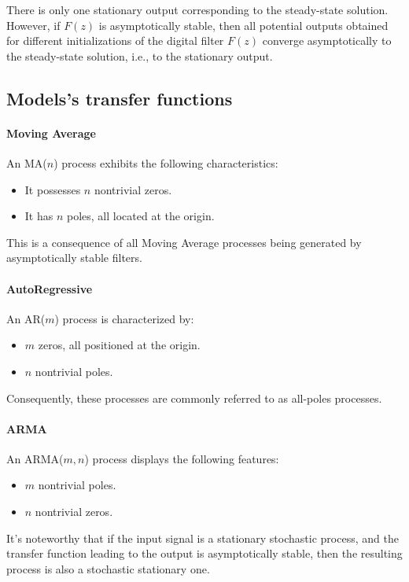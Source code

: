 \begin{theorem}
    There is only one stationary output corresponding to the steady-state solution.
    However, if $F(z)$ is asymptotically stable, then all potential outputs obtained for different initializations of the digital filter $F(z)$ converge asymptotically to the steady-state solution, i.e., to the stationary output.
\end{theorem}

\subsection{Models's transfer functions}
\paragraph*{Moving Average}
An MA($n$) process exhibits the following characteristics:
\begin{itemize}
    \item It possesses $n$ nontrivial zeros.
    \item It has $n$ poles, all located at the origin. 
\end{itemize}
This is a consequence of all Moving Average processes being generated by asymptotically stable filters.

\paragraph*{AutoRegressive}
An AR($m$) process is characterized by:
\begin{itemize}
    \item $m$ zeros, all positioned at the origin.
    \item $n$ nontrivial poles. 
\end{itemize}
Consequently, these processes are commonly referred to as all-poles processes.

\paragraph*{ARMA}
An ARMA($m,n$) process displays the following features:
\begin{itemize}
    \item $m$ nontrivial poles. 
    \item $n$ nontrivial zeros. 
\end{itemize}

It's noteworthy that if the input signal is a stationary stochastic process, and the transfer function leading to the output is asymptotically stable, then the resulting process is also a stochastic stationary one.